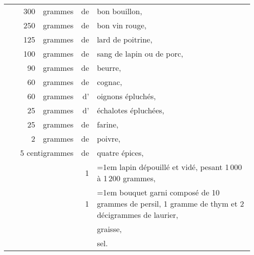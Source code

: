 \begin{longtable}{rrrrrp{18em}}
  & \hspace{2em} &  300 & grammes & de & bon bouillon,                                                    \\
  & \hspace{2em} &  250 & grammes & de & bon vin rouge,                                                   \\
  & \hspace{2em} &  125 & grammes & de & lard de poitrine,                                                \\
  & \hspace{2em} &  100 & grammes & de & sang de lapin ou de porc,                                        \\
  & \hspace{2em} &   90 & grammes & de & beurre,                                                          \\
  & \hspace{2em} &   60 & grammes & de & cognac,                                                          \\
  & \hspace{2em} &   60 & grammes & d' & oignons épluchés,                                                \\
  & \hspace{2em} &   25 & grammes & d' & échalotes épluchées,                                             \\
  & \hspace{2em} &   25 & grammes & de & farine,                                                          \\
  & \hspace{2em} &    2 & grammes & de & poivre,                                                          \\
  & \multicolumn{3}{r}{5 centigrammes} & de & quatre épices,                                              \\
  & \hspace{2em} &      &         &  1 & \hangindent=1em lapin dépouillé et vidé, pesant
                                         1 000 à 1 200 grammes,                                           \\
  & \hspace{2em} &      &         &  1 & \hangindent=1em bouquet garni composé de 10 grammes de persil,
                                         1 gramme de thym et 2 décigrammes de laurier,                    \\
  & \hspace{2em} &      &         &    & graisse,                                                         \\
  & \hspace{2em} &      &         &    & sel.                                                             \\
\end{longtable}
\normalsize

